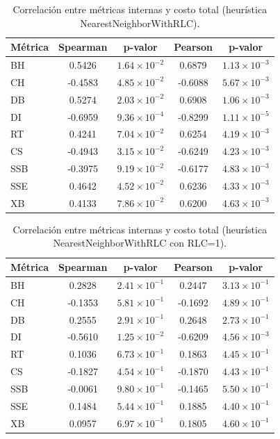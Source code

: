 \begin{table}[H]
\centering
\caption{Correlaci\'on entre m\'etricas internas y costo total (heur\'istica NearestNeighborWithRLC).}
\label{tab:correlacion_nnrlc}
\small
\begin{tabular}{@{}lcccc@{}}
\toprule
\textbf{M\'etrica} & \textbf{Spearman} & \textbf{p-valor} & \textbf{Pearson} & \textbf{p-valor} \\
\midrule
BH & 0.5426 & $1.64\times10^{-2}$ & 0.6879 & $1.13\times10^{-3}$ \\
CH & -0.4583 & $4.85\times10^{-2}$ & -0.6088 & $5.67\times10^{-3}$ \\
DB & 0.5274 & $2.03\times10^{-2}$ & 0.6908 & $1.06\times10^{-3}$ \\
DI & -0.6959 & $9.36\times10^{-4}$ & -0.8299 & $1.11\times10^{-5}$ \\
RT & 0.4241 & $7.04\times10^{-2}$ & 0.6254 & $4.19\times10^{-3}$ \\
CS & -0.4943 & $3.15\times10^{-2}$ & -0.6249 & $4.23\times10^{-3}$ \\
SSB & -0.3975 & $9.19\times10^{-2}$ & -0.6177 & $4.83\times10^{-3}$ \\
SSE & 0.4642 & $4.52\times10^{-2}$ & 0.6236 & $4.33\times10^{-3}$ \\
XB & 0.4133 & $7.86\times10^{-2}$ & 0.6200 & $4.63\times10^{-3}$ \\
\bottomrule
\end{tabular}
\end{table}

\begin{table}[H]
\centering
\caption{Correlaci\'on entre m\'etricas internas y costo total (heur\'istica NearestNeighborWithRLC con RLC=1).}
\label{tab:correlacion_nnrlc1}
\small
\begin{tabular}{@{}lcccc@{}}
\toprule
\textbf{M\'etrica} & \textbf{Spearman} & \textbf{p-valor} & \textbf{Pearson} & \textbf{p-valor} \\
\midrule
BH & 0.2828 & $2.41\times10^{-1}$ & 0.2447 & $3.13\times10^{-1}$ \\
CH & -0.1353 & $5.81\times10^{-1}$ & -0.1692 & $4.89\times10^{-1}$ \\
DB & 0.2555 & $2.91\times10^{-1}$ & 0.2648 & $2.73\times10^{-1}$ \\
DI & -0.5610 & $1.25\times10^{-2}$ & -0.6209 & $4.56\times10^{-3}$ \\
RT & 0.1036 & $6.73\times10^{-1}$ & 0.1863 & $4.45\times10^{-1}$ \\
CS & -0.1827 & $4.54\times10^{-1}$ & -0.1870 & $4.43\times10^{-1}$ \\
SSB & -0.0061 & $9.80\times10^{-1}$ & -0.1465 & $5.50\times10^{-1}$ \\
SSE & 0.1484 & $5.44\times10^{-1}$ & 0.1885 & $4.40\times10^{-1}$ \\
XB & 0.0957 & $6.97\times10^{-1}$ & 0.1805 & $4.60\times10^{-1}$ \\
\bottomrule
\end{tabular}
\end{table}

